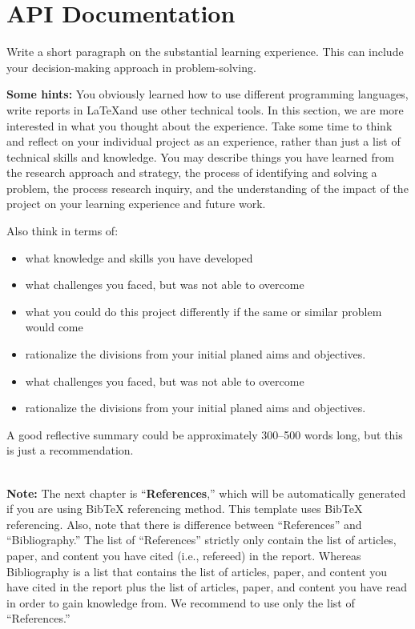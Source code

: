 \chapter{API Documentation}
\label{ch:reflection}
Write a short paragraph on the substantial learning experience. This can include your decision-making approach in problem-solving.

\textbf{Some hints:} You obviously learned how to use different programming languages, write reports in \LaTeX and use other technical tools. In this section, we are more interested in what you thought about the experience. Take some time to think and reflect on your individual project as an experience, rather than just a list of technical skills and knowledge. You may describe things you have learned from the research approach and strategy, the process of identifying and solving a problem, the process research inquiry, and the understanding of the impact of the project on your learning experience and future work.

Also think in terms of:
\begin{itemize}
    \item what knowledge and skills you have developed
    \item what challenges you faced, but was not able to overcome
    \item what you could do this project differently if the same or similar problem would come
    \item rationalize the divisions from your initial planed aims and objectives.
    \item what challenges you faced, but was not able to overcome
    \item rationalize the divisions from your initial planed aims and objectives.
\end{itemize}


A good reflective summary could be approximately 300--500 words long, but this is just a recommendation.

~\\[2em]
\noindent
{\huge \textbf{Note:}} The next chapter is ``\textbf{References},'' which will be automatically generated if you are using BibTeX referencing method. This template uses BibTeX referencing.  Also, note that there is difference between ``References'' and ``Bibliography.'' The list of ``References'' strictly only contain the list of articles, paper, and content you have cited (i.e., refereed) in the report. Whereas Bibliography is a list that contains the list of articles, paper, and content you have cited in the report plus the list of articles, paper, and content you have read in order to gain knowledge from. We recommend to use only the list of ``References.'' 



